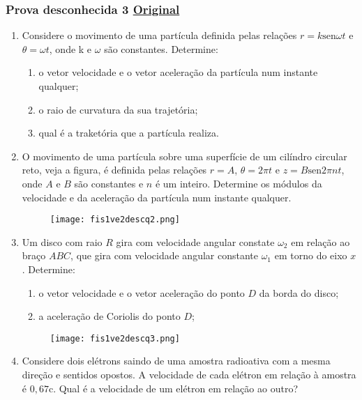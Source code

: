 \documentclass[12pt,a4paper]{article}
\newcommand{\sen}{\mathrm{sen}}
\newcommand{\original}[1]{\tiny \href{#1}{Original} \normalsize}
\begin{document}
\newpage

\subsubsection{Prova desconhecida 3 \original{https://drive.google.com/open?id=1mLobKXBUcGsyGsXz5k11rD2WTcIdK63o}}

\begin{enumerate}

\item Considere o movimento de uma partícula definida pelas relações $r=k \sen{\omega t}$ e $\theta=\omega t$, onde 
k e $\omega$ são constantes. Determine:

\begin{enumerate}[label=\alph*)]
\item o vetor velocidade e o vetor aceleração da partícula num instante qualquer;
\item o raio de curvatura da sua trajetória;
\item qual é a traketória que a partícula realiza.
\end{enumerate}

\vspace{1.2cm}

\item O movimento de uma partícula sobre uma superfície de um cilíndro circular reto, veja a figura, é definida pelas relações $r=A$, $\theta=2\pi t$ e
$z=B\sen{2\pi nt}$, onde $A$ e $B$ são constantes e $n$ é um inteiro. Determine os módulos da velocidade e da aceleração da partícula num instante qualquer.

\begin{figure}[ht]
\centering
\texttt{[image: fis1ve2descq2.png]}
\end{figure}
\newpage
\item Um disco com raio $R$ gira com velocidade angular constate $\omega_2$ em relação ao braço $ABC$, que gira com velocidade angular constante $\omega_1$ em 
torno do eixo $x$. Determine:

\begin{enumerate}[label=\alph*)]
\item o vetor velocidade e o vetor aceleração do ponto $D$ da borda do disco;
\item a aceleração de Coriolis do ponto $D$;

\end{enumerate}

\begin{figure}[ht]
\centering
\texttt{[image: fis1ve2descq3.png]}
\end{figure}
 
 \vspace{1.2cm}
 
\item Considere dois elétrons saindo de uma amostra radioativa com a mesma direção e sentidos opostos. A velocidade de cada elétron 
em relação à amostra é $0,67$c. Qual é a velocidade de um elétron em relação ao outro?

\end{enumerate}
\end{document}
